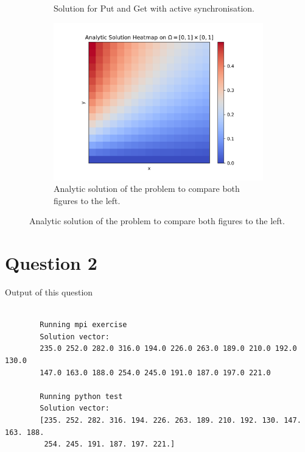 \documentclass[a4paper]{article}
\begin{document}
\begin{figure}[h!]
\begin{subfigure}[b]{0.32\textwidth}
			\caption{Solution for Put and Get with active synchronisation.}
			\label{fig:2}
		\end{subfigure}
		\hfill
		\begin{subfigure}[b]{0.32\textwidth}
			\includegraphics[width=\textwidth]{./../q1/plots/analytic_heatmap_plot.png}
			\caption{Analytic solution of the problem to compare both figures to the left.}
			\label{fig:3}
		\end{subfigure}

		\label{fig:heatmaps}
	\end{figure}


\section*{Question 2}
		
	Output of this question

	\begin{verbatim}

		Running mpi exercise
		Solution vector: 
		235.0 252.0 282.0 316.0 194.0 226.0 263.0 189.0 210.0 192.0 130.0 
		147.0 163.0 188.0 254.0 245.0 191.0 187.0 197.0 221.0 

		Running python test
		Solution vector:
		[235. 252. 282. 316. 194. 226. 263. 189. 210. 192. 130. 147. 163. 188.
		 254. 245. 191. 187. 197. 221.]

	\end{verbatim}







 
 
\end{document}
